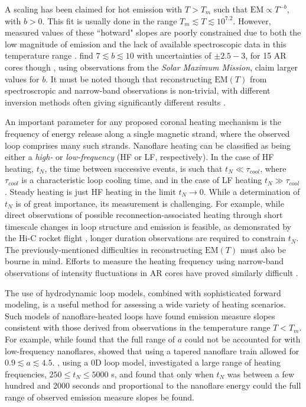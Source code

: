 \documentclass[preprint,linenumbers]{aastex}
\begin{document}
	\par A scaling has been claimed for hot emission with $T>T_m$ such that $\mathrm{EM}\propto T^{-b}$, with $b>0$. This fit is usually done in the range $T_m\lesssim T\lesssim10^{7.2}$. However, measured values of these ``hotward" slopes are poorly constrained due to both the low magnitude of emission and the lack of available spectroscopic data in this temperature range \citep{winebarger_defining_2012}. \citet{warren_systematic_2012} find $7\lesssim b\lesssim10$ with uncertainties of $\pm2.5-3$, for 15 AR cores though \citet{del_zanna_elemental_2014}, using observations from the \textit{Solar Maximum Mission}, claim larger values for $b$. It must be noted though that reconstructing $\mathrm{EM}(T)$ from spectroscropic and narrow-band observations is non-trivial, with different inversion methods often giving significantly different results \citep{landi_monte_2012,guennou_can_2013}.
	\par An important parameter for any proposed coronal heating mechanism is the frequency of energy release along a single magnetic strand, where the observed loop comprises many such strands. Nanoflare heating can be classified as being either a \textit{high-} or \textit{low-frequency} (HF or LF, respectively). In the case of HF heating, $t_N$, the time between successive events, is such that $t_N\ll\tau_{cool}$, where $\tau_{cool}$ is a characteristic loop cooling time, and in the case of LF heating $t_N\gg\tau_{cool}$ \citep{mulu-moore_can_2011,warren_constraints_2011,bradshaw_diagnosing_2012,reep_diagnosing_2013,cargill_modelling_2015}. Steady heating is just HF heating in the limit $t_N\to0$. While a determination of $t_N$ is of great importance, its measurement is challenging. For example, while direct observations of possible reconnection-associated heating through short timescale changes in loop structure and emission is feasible, as demonsrated by the Hi-C rocket flight \citep{cirtain_energy_2013,cargill_solar_2013}, longer duration observations are required to constrain $t_N$. The previously-mentioned difficulties in reconstructing $\mathrm{EM}(T)$ must also be bourne in mind. Efforts to measure the heating frequency using narrow-band observations of intensity fluctuations in AR cores  have proved similarly difficult \citep{ugarte-urra_determining_2014}.
	\par The use of hydrodynamic loop models, combined with sophisticated forward modeling, is a useful method for assessing a wide variety of heating scenarios. Such models of nanoflare-heated loops have found emission measure slopes consistent with those derived from observations in the temperature range $T<T_m$. For example, while \citet{bradshaw_diagnosing_2012} found that the full range of $a$ could not be accounted for with low-frequency nanoflares, \citet{reep_diagnosing_2013} showed that using a tapered nanoflare train allowed for $0.9\lesssim a\lesssim4.5$. \citet{cargill_active_2014}, using a 0D loop model, investigated a large range of heating frequencies, $250\le t_N\le5000$ s, and found that only when $t_N$ was between a few hundred and 2000 seconds and proportional to the nanoflare energy could the full range of observed emission measure slopes be found.
\end{document}
